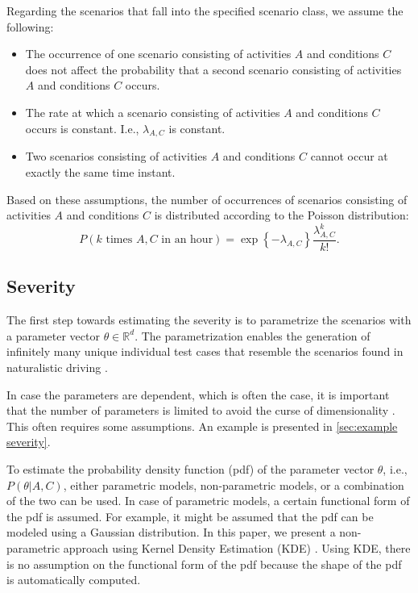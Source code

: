 Regarding the scenarios that fall into the specified scenario class, we assume the following:
\begin{itemize}
	\item The occurrence of one scenario consisting of activities $A$ and conditions $C$ does not affect the probability that a second scenario consisting of activities $A$ and conditions $C$ occurs.
	\item The rate at which a scenario consisting of activities $A$ and conditions $C$ occurs is constant. I.e., $\lambda_{A,C}$ is constant.
	\item Two scenarios consisting of activities $A$ and conditions $C$ cannot occur at exactly the same time instant.
\end{itemize}
Based on these assumptions, the number of occurrences of scenarios consisting of activities $A$ and conditions $C$ is distributed according to the Poisson distribution:
\begin{equation}
	P(k\text{ times }A,C\text{ in an hour}) = \exp \left\{-\lambda_{A,C} \right\} \frac{\lambda_{A,C}^k}{k!}.
\end{equation}



\subsection{Severity}
\label{sec:severity}

The first step towards estimating the severity is to parametrize the scenarios with a parameter vector $\theta \in \mathbb{R}^d$. The parametrization enables the generation of infinitely many unique individual test cases that resemble the scenarios found in naturalistic driving \cite{deGelder2017assessment,elrofai2018scenario}.

In case the parameters are dependent, which is often the case, it is important that the number of parameters is limited to avoid the curse of dimensionality \cite{scott2015multivariate}. This often requires some assumptions. An example is presented in \cref{sec:example severity}.

To estimate the probability density function (pdf) of the parameter vector $\theta$, i.e., $P(\theta|A,C)$, either parametric models, non-parametric models, or a combination of the two can be used. In case of parametric models, a certain functional form of the pdf is assumed. For example, it might be assumed that the pdf can be modeled using a Gaussian distribution. In this paper, we present a non-parametric approach using Kernel Density Estimation (KDE) \cite{rosenblatt1956remarks, parzen1962estimation}. Using KDE, there is no assumption on the functional form of the pdf because the shape of the pdf is automatically computed.

